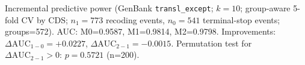 Incremental predictive power (GenBank \texttt{transl\_except}; $k=10$; group-aware 5-fold CV by CDS; $n_1=773$ recoding events, $n_0=541$ terminal-stop events; groups=572). AUC: M0=0.9587, M1=0.9814, M2=0.9798. Improvements: $\Delta\mathrm{AUC}_{1-0}=+0.0227$, $\Delta\mathrm{AUC}_{2-1}=-0.0015$. Permutation test for $\Delta\mathrm{AUC}_{2-1}>0$: $p=0.5721$ (n=200).
